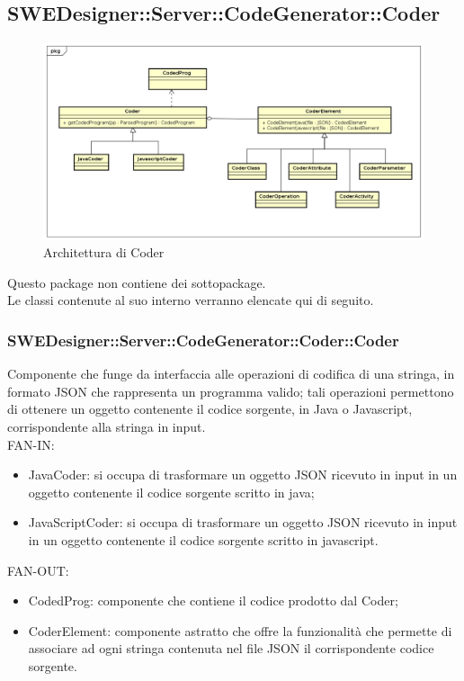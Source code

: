 \documentclass[../PianoDiQualifica.tex]{subfiles}
\begin{document}
		\subsection{SWEDesigner::Server::CodeGenerator::Coder}
			\begin{figure}[H]\label{fig:Coder}
				\centering
				\includegraphics[scale=0.46]{Immagini/DiagrammaArchitettura/Coder.png}
				\caption{Architettura di Coder}
			\end{figure}
		Questo package non contiene dei sottopackage.\\
		Le classi contenute al suo interno verranno elencate qui di seguito.
		\subsubsection{SWEDesigner::Server::CodeGenerator::Coder::Coder}
		Componente che funge da interfaccia alle operazioni di codifica di una stringa, in formato JSON che rappresenta un programma valido; tali operazioni permettono di ottenere un oggetto contenente il codice sorgente, in Java o Javascript, corrispondente alla stringa in input.\\
		FAN-IN:
		\begin{itemize}
			\item JavaCoder: si occupa di trasformare un oggetto JSON ricevuto in input in un oggetto contenente il codice sorgente scritto in java;
			\item JavaScriptCoder: si occupa di trasformare un oggetto JSON ricevuto in input in un oggetto contenente il codice sorgente scritto in javascript.
		\end{itemize}
		FAN-OUT:
		\begin{itemize}
			\item CodedProg: componente che contiene il codice prodotto dal Coder;
			\item CoderElement: componente astratto che offre la funzionalità che permette di associare ad ogni stringa contenuta nel file JSON il corrispondente codice sorgente.
		\end{itemize}
\end{document}
